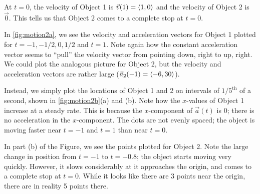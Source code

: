 \begin{example}
At $t=0$, the velocity of Object 1 is $\vec v(1) =\left\langle 1,0\right\rangle$ and the velocity of Object 2 is $\vec 0$. This tells us that Object 2 comes to a complete stop at $t=0$. 

In \autoref{fig:motion2a}, we see the velocity and acceleration vectors for Object 1 plotted for $t=-1, -1/2, 0, 1/2$ and $t=1$. Note again how the constant acceleration vector seems to ``pull'' the velocity vector from pointing down, right to up, right. We could plot the analogous picture for Object 2, but the velocity and acceleration vectors are rather large ($\vec a_2(-1) =\left\langle -6,30\right\rangle$). 

Instead, we simply plot the locations of Object 1 and 2  on intervals of $1/5^{\text{th}}$ of a second, shown in \autoref{fig:motion2b}(a) and (b). Note how the $x$-values of Object 1 increase at a steady rate. This is because the $x$-component of $\vec a(t)$ is 0; there is no acceleration in the $x$-component. The dots are not evenly spaced; the object is moving faster near $t=-1$ and $t=1$ than near $t=0$.

In part (b) of the Figure, we see the points plotted for Object 2. Note the large change in position from $t=-1$ to $t=-0.8$; the object starts moving very quickly. However, it slows considerably at it approaches the origin, and comes to a complete stop at $t=0$. While it looks like there are 3 points near the origin, there are in reality 5 points there.


\end{example}
